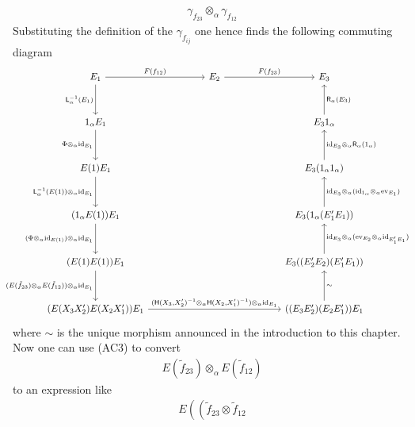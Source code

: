 \begin{prf}[Sketch]
\begin{enumerate}
\begin{align*}
  \gamma_{f_{23}}
  \otimes_{\alpha}
  \gamma_{f_{12}}
\end{align*}
Substituting the definition of the $\gamma_{f_{ij}}$ one hence finds the following commuting diagram
\begin{equation*}
\hspace{-1em}
\begin{tikzcd}[row sep=3.2em,column sep=6em]
  E_{1}
  \ar{r}{F(f_{12})}
  \ar{d}[swap]{\mathsf{L}_{\alpha}^{-1}(E_{1})}
  &
  E_{2}
  \ar{r}{F(f_{23})}
  &
  E_{3}
  \\
  1_{\alpha} E_{1}
  \ar{d}[swap]{\Phi \otimes_{\alpha} \mathrm{id}_{E_{1}}}
  &
  &
  E_{3} 1_{\alpha}
  \ar{u}[swap]{\mathsf{R}_{\alpha}(E_{3})}
  \\
  E(1) E_{1}
  \ar{d}[swap]{\mathsf{L}_{\alpha}^{-1}(E(1)) \otimes_{\alpha} \mathrm{id}_{E_{1}}}
  &
  &
  E_{3} (1_{\alpha} 1_{\alpha})
  \ar{u}[swap]{\mathrm{id}_{E_{3}} \otimes_{\alpha} \mathsf{R}_{\alpha}(1_{\alpha})}
  \\
  (1_{\alpha} E(1)) E_{1}
  \ar{d}[swap]{(\Phi \otimes_{\alpha} \mathrm{id}_{E(1)}) \otimes_{\alpha} \mathrm{id}_{E_{1}}}
  &
  &
  E_{3} (1_{\alpha} (E_{1}^{\prime} E_{1}))
  \ar{u}[swap]{\mathrm{id}_{E_{3}} \otimes_{\alpha} (\mathrm{id}_{1_{\alpha}} \otimes_{\alpha} \mathrm{ev}_{E_{1}})}
  \\
  (E(1) E(1)) E_{1}
  \ar{d}[swap]{(E(\tilde{f}_{23}) \otimes_{\alpha} E(\tilde{f}_{12})) \otimes_{\alpha} \mathrm{id}_{E_{1}}}
  &
  &
  E_{3} ((E_{2}^{\prime} E_{2}) (E_{1}^{\prime} E_{1}))
  \ar{u}[swap]{\mathrm{id}_{E_{3}} \otimes_{\alpha} (\mathrm{ev}_{E_{2}} \otimes_{\alpha} \mathrm{id}_{E_{1}^{\prime} E_{1}})}
  \\
  (E(X_{3} X_{2}^{\prime}) E(X_{2} X_{1}^{\prime})) E_{1}
  \ar{rr}{(\mathsf{H}(X_{3},X_{2}^{\prime})^{-1} \otimes_{\alpha} \mathsf{H}(X_{2},X_{1}^{\prime})^{-1}) \otimes_{\alpha} \mathrm{id}_{E_{1}}}
  &
  &
  ((E_{3} E_{2}^{\prime}) (E_{2} E_{1}^{\prime})) E_{1}
  \ar{u}[swap]{\sim}
\end{tikzcd}
\end{equation*}
where $\sim$ is the unique morphism announced in the introduction to this chapter.
\\
Now one can use (AC3) to convert
\begin{align*}
  E(\tilde{f}_{23})
  \otimes_{\alpha}
  E(\tilde{f}_{12})
\end{align*}
to an expression like
\begin{align*}
  E
  \left(
    \left(
      \tilde{f}_{23}
      \otimes
      \tilde{f}_{12}

\end{align*}
\end{enumerate}
\end{prf}
